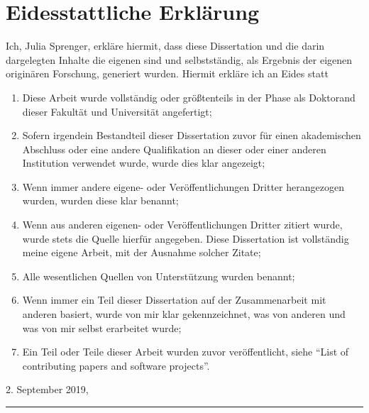 \cleardoublepage
\thispagestyle{empty}

\section*{Eidesstattliche Erkl\"arung}
\label{sec:SOOA}

Ich, Julia Sprenger, erkläre hiermit, dass diese Dissertation und die darin dargelegten Inhalte die eigenen sind und selbstständig, als Ergebnis der eigenen originären Forschung, generiert wurden. Hiermit erkläre ich an Eides statt

\begin{enumerate}
 \item Diese Arbeit wurde vollständig oder größtenteils in der Phase als Doktorand dieser Fakultät und Universität angefertigt;
 \item Sofern irgendein Bestandteil dieser Dissertation zuvor für einen akademischen Abschluss oder eine andere Qualifikation an dieser oder einer anderen Institution verwendet wurde, wurde dies klar angezeigt;
 \item Wenn immer andere eigene- oder Veröffentlichungen Dritter herangezogen wurden, wurden diese klar benannt;
 \item Wenn aus anderen eigenen- oder Veröffentlichungen Dritter zitiert wurde, wurde stets die Quelle hierfür angegeben. Diese Dissertation ist vollständig meine eigene Arbeit, mit der Ausnahme solcher Zitate;
 \item Alle wesentlichen Quellen von Unterstützung wurden benannt;
 \item Wenn immer ein Teil dieser Dissertation auf der Zusammenarbeit mit anderen basiert, wurde von mir klar gekennzeichnet, was von anderen und was von mir selbst erarbeitet wurde;
 \item Ein Teil oder Teile dieser Arbeit wurden zuvor veröffentlicht, siehe ``List of contributing papers and software projects''.\\
\end{enumerate}

\vspace{1cm}

2. September 2019, \rule[-2pt]{5cm}{0.4pt}
